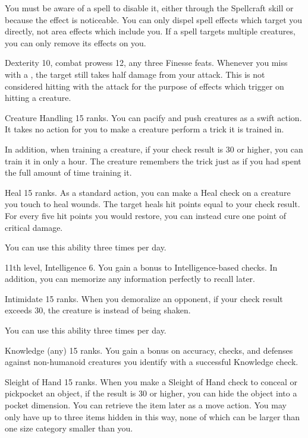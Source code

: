 You must be aware of a spell to disable it, either through the Spellcraft skill or because the effect is noticeable.
You can only dispel spell effects which target you directly, not area effects which include you.
If a spell targets multiple creatures, you can only remove its effects on you.

\featpres Dexterity 10, combat prowess 12, any three Finesse feats.
\featben Whenever you miss with a , the target still takes half damage from your attack.
This is not considered hitting with the attack for the purpose of effects which trigger on hitting a creature.

\featpre Creature Handling 15 ranks.
\featben You can pacify and push creatures as a swift action.
It takes no action for you to make a creature perform a trick it is trained in.

In addition, when training a creature, if your check result is 30 or higher, you can train it in only a hour.
The creature remembers the trick just as if you had spent the full amount of time training it.

\featpre Heal 15 ranks.
\featben As a standard action, you can make a Heal check on a creature you touch to heal wounds.
The target heals hit points equal to your check result.
For every five hit points you would restore, you can instead cure one point of critical damage.

You can use this ability three times per day.

\featpres 11th level, Intelligence 6.
\featben You gain a  bonus to Intelligence-based checks.
In addition, you can memorize any information perfectly to recall later.

\featpre Intimidate 15 ranks.
\featben When you demoralize an opponent, if your check result exceeds 30, the creature is \panicked instead of being shaken.

You can use this ability three times per day.

\featpre Knowledge (any) 15 ranks.
\featben You gain a  bonus on accuracy, checks, and defenses against non-humanoid creatures you identify with a successful Knowledge check.

\featpre Sleight of Hand 15 ranks.
\featben When you make a Sleight of Hand check to conceal or pickpocket an object, if the result is 30 or higher, you can hide the object into a pocket dimension.
You can retrieve the item later as a move action.
You may only have up to three items hidden in this way, none of which can be larger than one size category smaller than you.

